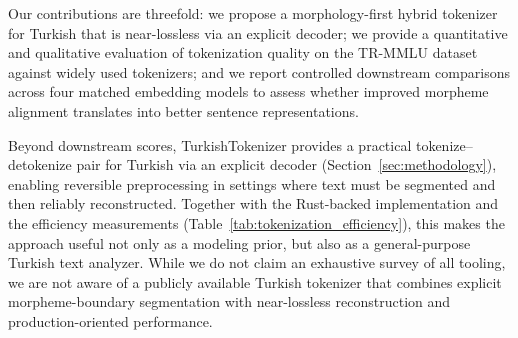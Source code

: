 Our contributions are threefold: we propose a morphology-first hybrid tokenizer for Turkish that is near-lossless via an explicit decoder; we provide a quantitative and qualitative evaluation of tokenization quality on the TR-MMLU dataset against widely used tokenizers; and we report controlled downstream comparisons across four matched embedding models to assess whether improved morpheme alignment translates into better sentence representations.

Beyond downstream scores, TurkishTokenizer provides a practical tokenize--detokenize pair for Turkish via an explicit decoder (Section~\ref{sec:methodology}), enabling reversible preprocessing in settings where text must be segmented and then reliably reconstructed. Together with the Rust-backed implementation and the efficiency measurements (Table~\ref{tab:tokenization_efficiency}), this makes the approach useful not only as a modeling prior, but also as a general-purpose Turkish text analyzer. While we do not claim an exhaustive survey of all tooling, we are not aware of a publicly available Turkish tokenizer that combines explicit morpheme-boundary segmentation with near-lossless reconstruction and production-oriented performance.
